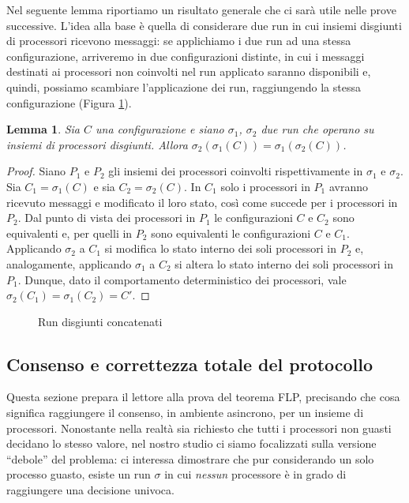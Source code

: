 \documentclass{article}
\newtheorem{lemma}{Lemma}
\begin{document}
Nel seguente lemma riportiamo un risultato generale che ci sar\`a
utile nelle prove successive. L'idea alla base \`e quella di
considerare due run in cui insiemi disgiunti di processori ricevono
messaggi: se applichiamo i due run ad una stessa configurazione,
arriveremo in due configurazioni distinte, in cui i messaggi destinati
ai processori non coinvolti nel run applicato saranno disponibili e,
quindi, possiamo scambiare l'applicazione dei run, raggiungendo la
stessa configurazione (Figura \ref{fig:concatenazioneSchedule}).

\begin{lemma}
  Sia $C$ una configurazione e siano $\sigma_1$, $\sigma_2$ due run
  che operano su insiemi di processori disgiunti. Allora
  $\sigma_2(\sigma_1(C))=\sigma_1(\sigma_2(C))$.
\end{lemma}

\begin{proof}
  Siano $P_1$ e $P_2$ gli insiemi dei processori coinvolti
  rispettivamente in $\sigma_1$ e $\sigma_2$. Sia $C_1=\sigma_1(C)$ e
  sia $C_2=\sigma_2(C)$. In $C_1$ solo i processori in $P_1$ avranno
  ricevuto messaggi e modificato il loro stato, così come succede per
  i processori in $P_2$. Dal punto di vista dei processori in $P_1$ le
  configurazioni $C$ e $C_2$ sono equivalenti e, per quelli in $P_2$
  sono equivalenti le configurazioni $C$ e $C_1$. Applicando
  $\sigma_2$ a $C_1$ si modifica lo stato interno dei soli processori
  in $P_2$ e, analogamente, applicando $\sigma_1$ a $C_2$ si altera lo
  stato interno dei soli processori in $P_1$. Dunque, dato il
  comportamento deterministico dei processori, vale
  $\sigma_2(C_1)=\sigma_1(C_2)=C'$.
\end{proof}

\begin{figure}[!h]
  \centering \caption{Run
    disgiunti concatenati}\label{fig:concatenazioneSchedule}
\end{figure}

\subsection{Consenso e correttezza totale del protocollo}

Questa sezione prepara il lettore alla prova del teorema FLP,
precisando che cosa significa raggiungere il consenso, in ambiente
asincrono, per un insieme di processori. Nonostante nella realt\`a sia
richiesto che tutti i processori non guasti decidano lo stesso valore,
nel nostro studio ci siamo focalizzati sulla versione ``debole'' del
problema: ci interessa dimostrare che pur considerando un solo
processo guasto, esiste un run $\sigma$ in cui \emph{nessun}
processore \`e in grado di raggiungere una decisione univoca.
\end{document}
